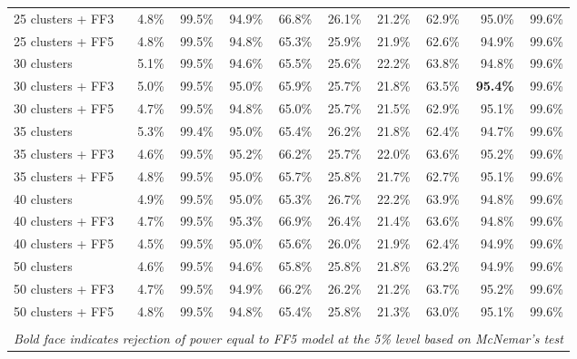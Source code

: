 \begin{table}[!h]
\begin{center}
\begin{tabular}{lrrrrrrrrr}
25 clusters + FF3	& 4.8\% & 99.5\% & 94.9\% & 66.8\% & 26.1\% & 21.2\% & 62.9\% & 95.0\% & 99.6\% \\
25 clusters + FF5	& 4.8\% & 99.5\% & 94.8\% & 65.3\% & 25.9\% & 21.9\% & 62.6\% & 94.9\% & 99.6\% \\
30 clusters	& 5.1\% & 99.5\% & 94.6\% & 65.5\% & 25.6\% & 22.2\% & 63.8\% & 94.8\% & 99.6\% \\
30 clusters + FF3	& 5.0\% & 99.5\% & 95.0\% & 65.9\% & 25.7\% & 21.8\% & 63.5\% & \textbf{95.4\%} & 99.6\% \\
30 clusters + FF5	& 4.7\% & 99.5\% & 94.8\% & 65.0\% & 25.7\% & 21.5\% & 62.9\% & 95.1\% & 99.6\% \\
35 clusters	& 5.3\% & 99.4\% & 95.0\% & 65.4\% & 26.2\% & 21.8\% & 62.4\% & 94.7\% & 99.6\% \\
35 clusters + FF3	& 4.6\% & 99.5\% & 95.2\% & 66.2\% & 25.7\% & 22.0\% & 63.6\% & 95.2\% & 99.6\% \\
35 clusters + FF5	& 4.8\% & 99.5\% & 95.0\% & 65.7\% & 25.8\% & 21.7\% & 62.7\% & 95.1\% & 99.6\% \\
40 clusters	& 4.9\% & 99.5\% & 95.0\% & 65.3\% & 26.7\% & 22.2\% & 63.9\% & 94.8\% & 99.6\% \\
40 clusters + FF3	& 4.7\% & 99.5\% & 95.3\% & 66.9\% & 26.4\% & 21.4\% & 63.6\% & 94.8\% & 99.6\% \\
40 clusters + FF5	& 4.5\% & 99.5\% & 95.0\% & 65.6\% & 26.0\% & 21.9\% & 62.4\% & 94.9\% & 99.6\% \\
50 clusters	& 4.6\% & 99.5\% & 94.6\% & 65.8\% & 25.8\% & 21.8\% & 63.2\% & 94.9\% & 99.6\% \\
50 clusters + FF3	& 4.7\% & 99.5\% & 94.9\% & 66.2\% & 26.2\% & 21.2\% & 63.7\% & 95.2\% & 99.6\% \\
50 clusters + FF5	& 4.8\% & 99.5\% & 94.8\% & 65.4\% & 25.8\% & 21.3\% & 63.0\% & 95.1\% & 99.6\% \\
\hline\\
\multicolumn{10}{l}{\itshape Bold face indicates rejection of power equal to FF5 model at the 5\% level based on McNemar's test}
    \end{tabular}
    \end{center}
\end{table}
